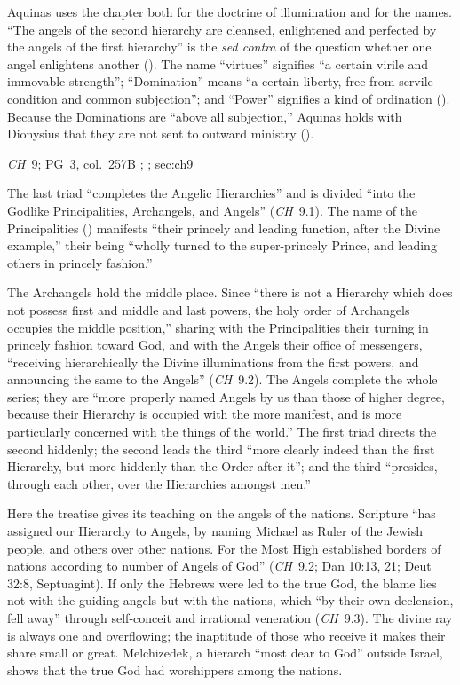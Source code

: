 Aquinas uses the chapter both for the doctrine of illumination and for
the names. ``The angels of the second hierarchy are cleansed,
enlightened and perfected by the angels of the first hierarchy'' is the
\emph{sed contra} of the question whether one angel enlightens another
(). The name ``virtues'' signifies ``a certain
virile and immovable strength''; ``Domination'' means ``a certain
liberty, free from servile condition and common subjection''; and
``Power'' signifies a kind of ordination ().
Because the Dominations are ``above all subjection,'' Aquinas holds with
Dionysius that they are not sent to outward ministry ().

{\emph{CH}~9; PG~3, col.~257B}
{; ; }{sec:ch9}

The last triad ``completes the Angelic Hierarchies'' and is divided
``into the Godlike Principalities, Archangels, and Angels'' (\emph{CH}~9.1). The name of the Principalities () manifests ``their
princely and leading function, after the Divine example,'' their being
``wholly turned to the super-princely Prince, and leading others in
princely fashion.''

The Archangels hold the middle place. Since ``there is not a Hierarchy
which does not possess first and middle and last powers, the holy order
of Archangels occupies the middle position,'' sharing with the
Principalities their turning in princely fashion toward God, and with
the Angels their office of messengers, ``receiving hierarchically the
Divine illuminations from the first powers, and announcing the same to
the Angels'' (\emph{CH}~9.2). The Angels complete the whole series; they
are ``more properly named Angels by us than those of higher degree,
because their Hierarchy is occupied with the more manifest, and is more
particularly concerned with the things of the world.'' The first triad
directs the second hiddenly; the second leads the third ``more clearly
indeed than the first Hierarchy, but more hiddenly than the Order after
it''; and the third ``presides, through each other, over the Hierarchies
amongst men.''

Here the treatise gives its teaching on the angels of the nations.
Scripture ``has assigned our Hierarchy to Angels, by naming Michael as
Ruler of the Jewish people, and others over other nations. For the Most
High established borders of nations according to number of Angels of
God'' (\emph{CH}~9.2; Dan 10:13, 21; Deut 32:8, Septuagint). If only the
Hebrews were led to the true God, the blame lies not with the guiding
angels but with the nations, which ``by their own declension, fell away''
through self-conceit and irrational veneration (\emph{CH}~9.3). The
divine ray is always one and overflowing; the inaptitude of those who
receive it makes their share small or great. Melchizedek, a hierarch
``most dear to God'' outside Israel, shows that the true God had
worshippers among the nations.

